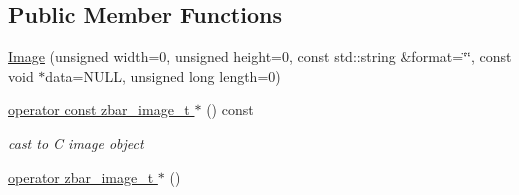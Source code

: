 \subsection*{Public Member Functions}
\begin{DoxyCompactItemize}
\item 
\hyperlink{classzbar_1_1_image_a5134e2e814da0d0070ef165898980848}{Image} (unsigned width=0, unsigned height=0, const std::string \&format=\char`\"{}\char`\"{}, const void $\ast$data=NULL, unsigned long length=0)
\item 
\hypertarget{classzbar_1_1_image_a551a3a9805095e65b765db7199f5ecc6}{
\hyperlink{classzbar_1_1_image_a551a3a9805095e65b765db7199f5ecc6}{operator const zbar\_\-image\_\-t $\ast$} () const }
\label{classzbar_1_1_image_a551a3a9805095e65b765db7199f5ecc6}

\begin{DoxyCompactList}\small\item\em cast to C image object \end{DoxyCompactList}\item 
\hypertarget{classzbar_1_1_image_a561de682e0b185b2a58492c47b766384}{
\hyperlink{classzbar_1_1_image_a561de682e0b185b2a58492c47b766384}{operator zbar\_\-image\_\-t $\ast$} ()}
\label{classzbar_1_1_image_a561de682e0b185b2a58492c47b766384}


\end{DoxyCompactItemize}
